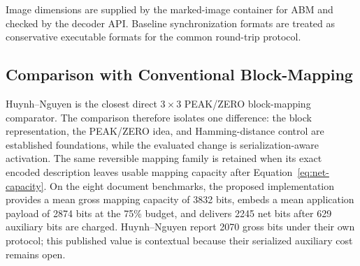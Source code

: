 \documentclass[a4paper,fleqn]{cas-dc}
\newcommand{\RevisionAddBegin}{\begingroup}
\newcommand{\RevisionAddEnd}{\endgroup}
\newcommand{\RevisionAddBegin}{\begingroup\color{revisionblue}}
\newcommand{\RevisionAddEnd}{\endgroup}
\begin{document}
\begin{table}[t]
\centering
\caption{Executable auxiliary-information model used for exact extraction and
restoration.}
\label{tab:wire-model}
\vspace{2pt}
{\footnotesize\RaggedRight Image dimensions are supplied by the marked-image container for ABM
and checked by the decoder API. Baseline synchronization formats are treated
as conservative executable formats for the common round-trip protocol.\par}
\end{table}

\subsection{Comparison with Conventional Block-Mapping}

\RevisionAddBegin
Huynh--Nguyen \cite{Huynh2025BlockMapping} is the closest direct
$3\times3$ PEAK/ZERO block-mapping comparator. The comparison therefore
isolates one difference: the block representation, the PEAK/ZERO idea, and
Hamming-distance control are established foundations, while the evaluated
change is serialization-aware activation. The same reversible mapping family is
retained when its exact encoded description leaves usable mapping capacity after
Equation~\ref{eq:net-capacity}. On the eight document benchmarks, the proposed
implementation provides a mean gross mapping capacity of 3832 bits, embeds a
mean application payload of 2874 bits at the 75\% budget, and delivers 2245
net bits after 629 auxiliary bits are charged. Huynh--Nguyen report 2070 gross
bits under their
own protocol; this published value is contextual because
their serialized auxiliary cost remains open.
\RevisionAddEnd
\end{document}
